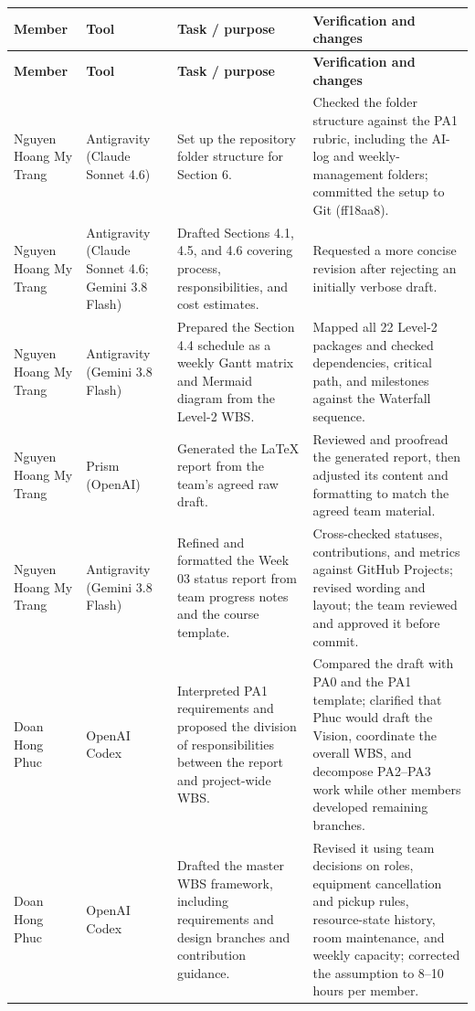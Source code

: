 \documentclass[11pt]{article}
\begin{document}
\footnotesize
\begin{longtable}{@{}L{2.8cm}L{2.0cm}L{5.0cm}L{5.8cm}@{}}
\toprule
\textbf{Member} & \textbf{Tool} & \textbf{Task / purpose} & \textbf{Verification and changes} \\
\midrule
\endfirsthead
\toprule
\textbf{Member} & \textbf{Tool} & \textbf{Task / purpose} & \textbf{Verification and changes} \\
\midrule
\endhead
Nguyen Hoang My Trang & Antigravity (Claude Sonnet 4.6) & Set up the repository folder structure for Section 6. & Checked the folder structure against the PA1 rubric, including the AI-log and weekly-management folders; committed the setup to Git (ff18aa8). \\
Nguyen Hoang My Trang & Antigravity (Claude Sonnet 4.6; Gemini 3.8 Flash) & Drafted Sections 4.1, 4.5, and 4.6 covering process, responsibilities, and cost estimates. & Requested a more concise revision after rejecting an initially verbose draft. \\
Nguyen Hoang My Trang & Antigravity (Gemini 3.8 Flash) & Prepared the Section 4.4 schedule as a weekly Gantt matrix and Mermaid diagram from the Level-2 WBS. & Mapped all 22 Level-2 packages and checked dependencies, critical path, and milestones against the Waterfall sequence. \\
Nguyen Hoang My Trang & Prism (OpenAI) & Generated the LaTeX report from the team's agreed raw draft. & Reviewed and proofread the generated report, then adjusted its content and formatting to match the agreed team material. \\
Nguyen Hoang My Trang & Antigravity (Gemini 3.8 Flash) & Refined and formatted the Week 03 status report from team progress notes and the course template. & Cross-checked statuses, contributions, and metrics against GitHub Projects; revised wording and layout; the team reviewed and approved it before commit. \\
Doan Hong Phuc & OpenAI Codex & Interpreted PA1 requirements and proposed the division of responsibilities between the report and project-wide WBS. & Compared the draft with PA0 and the PA1 template; clarified that Phuc would draft the Vision, coordinate the overall WBS, and decompose PA2--PA3 work while other members developed remaining branches. \\
Doan Hong Phuc & OpenAI Codex & Drafted the master WBS framework, including requirements and design branches and contribution guidance. & Revised it using team decisions on roles, equipment cancellation and pickup rules, resource-state history, room maintenance, and weekly capacity; corrected the assumption to 8--10 hours per member. \\

\end{longtable}
\end{document}
